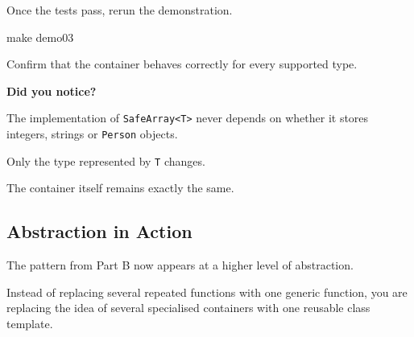 \documentclass{csc2059practical}
\begin{document}
Once the tests pass, rerun the demonstration.

\begin{terminal}
make demo03
\end{terminal}

Confirm that the container behaves correctly for every supported type.

\begin{tipbox}
\textbf{Did you notice?}

The implementation of \texttt{SafeArray<T>} never depends on whether it stores integers, strings or \texttt{Person} objects.

Only the type represented by \texttt{T} changes.

The container itself remains exactly the same.
\end{tipbox}

\subsection{Abstraction in Action}

The pattern from Part B now appears at a higher level of abstraction.

Instead of replacing several repeated functions with one generic function, you are replacing the idea of several specialised containers with one reusable class template.
\end{document}
